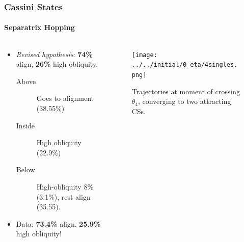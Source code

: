 \documentclass[dvipsnames]{beamer}
\begin{document}
\begin{frame}
    \frametitle{Cassini States}
    \framesubtitle{Separatrix Hopping}

    \begin{columns}
        \begin{column}{0.47\textwidth}
            \begin{itemize}
                \item \emph{Revised hypothesis}: \textbf{74\%} align,
                    \textbf{26\%} high obliquity,
                    \begin{description}
                        \item[Above] Goes to alignment (38.55\%)
                        \item[Inside] High obliquity (22.9\%)
                        \item[Below] High-obliquity 8\% (3.1\%),
                            rest align (35.55).
                    \end{description}

                \item Data: \textbf{73.4\%} align, \textbf{25.9\%}
                    high obliquity!
            \end{itemize}
        \end{column}
        \begin{column}{0.47\textwidth}
            \begin{figure}[t]
                \centering
                \texttt{[image: ../../initial/0\_eta/4singles.png]}
                \caption{Trajectories at moment of crossing $\theta_4$,
                converging to two attracting CSs.}
            \end{figure}
        \end{column}
    \end{columns}
\end{frame}
\end{document}
